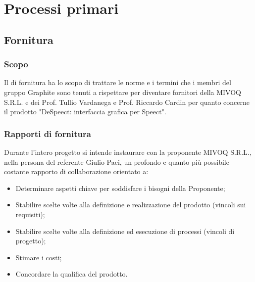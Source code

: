 \documentclass[../NormediProgetto.tex]{subfiles}
\begin{document}
	
	
\chapter{Processi primari}


\section{Fornitura}


\subsection{Scopo}

Il  di fornitura ha lo scopo di trattare le norme e i termini che i membri del gruppo Graphite sono tenuti a rispettare per diventare fornitori della  MIVOQ S.R.L. e dei  Prof. Tullio Vardanega e Prof. Riccardo Cardin per quanto concerne il prodotto "DeSpeect: interfaccia grafica per Speect".

\subsection{Rapporti di fornitura}

Durante l'intero progetto si intende instaurare con la proponente MIVOQ S.R.L., nella persona del referente Giulio Paci, un profondo e quanto più possibile costante rapporto di collaborazione orientato a:

\begin{itemize}
	\item Determinare aspetti chiave per soddisfare i bisogni della Proponente;
	
	\item Stabilire scelte volte alla definizione e realizzazione del prodotto (vincoli sui requisiti);
	
	\item Stabilire scelte volte alla definizione ed esecuzione di processi (vincoli di progetto);
	
	\item Stimare i costi;
	
	\item Concordare la qualifica del prodotto.
\end{itemize}
\end{document}
